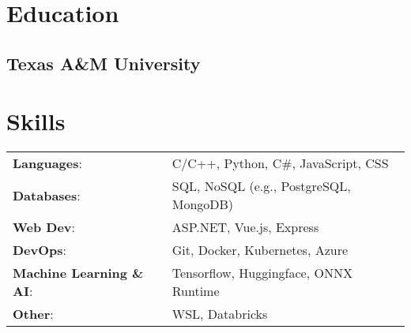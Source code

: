 \documentclass[]{resume-openfont}
\begin{document}
\begin{minipage}[t]{1\textwidth} 
\end{minipage}

\vspace{2 mm}

\begin{minipage}[t]{0.4\textwidth} 
    \section{\Large Education} 
    \subsection{Texas A\&M University}
\end{minipage}%
\hfill
\begin{minipage}[t]{0.6\textwidth}
    \section{\Large Skills}
        \begin{tabular}{@{}l l}
            \textbf{Languages}: & C/C++, Python, C\#, JavaScript, CSS \\
            \textbf{Databases}: & SQL, NoSQL (e.g., PostgreSQL, MongoDB) \\
            \textbf{Web Dev}: & ASP.NET, Vue.js, Express \\
            \textbf{DevOps}: & Git, Docker, Kubernetes, Azure \\
            \textbf{Machine Learning \& AI}: & Tensorflow, Huggingface, ONNX Runtime \\
            \textbf{Other}: & WSL, Databricks \\
        \end{tabular}
\end{minipage}
\end{document}
